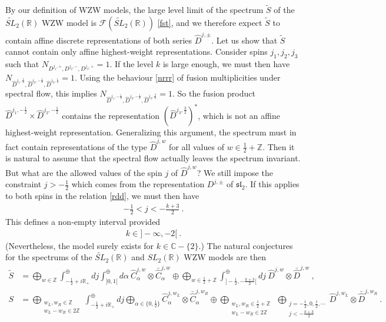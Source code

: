 \documentclass[12pt, a4paper, notitlepage, twoside]{report}
\numberwithin{equation}{section}
\theoremstyle{break}
\begin{document}
By our definition of WZW models, the large level limit of the spectrum $\tilde{S}$ of the $\widetilde{SL}_2(\mathbb{R})$ WZW model is $\mathcal{F}(\widetilde{SL}_2(\mathbb{R}))$ \eqref{fst}, and we therefore expect $\tilde{S}$ to contain affine discrete representations of both series $\hat{D}^{j,\pm}$.
Let us show that $\tilde{S}$ cannot contain only affine highest-weight representations.
Consider spins $j_1,j_2,j_3$ such that $N_{D^{j_1,+},D^{j_2,-},D^{j_3,+}}=1$.
If the level $k$ is large enough, we must then have $N_{\hat{D}^{j_1,\frac12},\hat{D}^{j_2,-\frac12},\hat{D}^{j_3,\frac12}}=1$.
Using the behaviour \eqref{nrrr} of fusion multiplicities under spectral flow, this implies $N_{\hat{D}^{j_1,-\frac12},\hat{D}^{j_2,-\frac12},\hat{D}^{j_3,\frac32}}=1$.
So the fusion product $\hat{D}^{j_1,-\frac12}\times \hat{D}^{j_2,-\frac12}$ contains the representation $(\hat{D}^{j_3,\frac32})^*$, which is not an affine highest-weight representation.
Generalizing this argument, the spectrum must in fact contain 
representations of the type $\hat{D}^{j,w}$ for all values of $w\in \frac12+{\mathbb{Z}}$.
Then it is natural to assume that the spectral flow actually leaves the spectrum invariant.
But what are the allowed values of the spin $j$ of $\hat{D}^{j,w}$? We still impose the constraint $j>-\frac12$ which comes from the representation $D^{j,\pm}$ of $\mathfrak{sl}_2$.
If this applies to both spins in the relation \eqref{rdd}, we must then have 
\begin{align}
 -\frac12 <j < -\frac{k+3}{2}\ .
\label{jimm}
\end{align}
This defines a non-empty interval provided
\begin{align}
 \boxed{k\in]-\infty,-2[}\ .
\end{align}
(Nevertheless, the model surely exists for $k\in \mathbb{C}-\{2\}$.)
The natural conjectures for the spectrums of the $\widetilde{SL}_2(\mathbb{R})$ and $SL_2(\mathbb{R})$ WZW models are then
\begin{align}
 \tilde{S} &= \bigoplus_{w\in{\mathbb{Z}}}\int^\oplus_{-\frac12+i{\mathbb{R}}_+} dj \int^\oplus_{]0,1[} d\alpha\ \hat{C}^{j,w}_\alpha \otimes \bar{\hat{C}}^{j,w}_{\alpha} 
\oplus \bigoplus_{w\in\frac12+{\mathbb{Z}}}\int^\oplus_{]-\frac12,-\frac{k+3}{2}[} dj\ \hat{D}^{j,w}\otimes \bar{\hat{D}}^{j,w} \ ,
\\
 S &= \bigoplus_{\substack{w_L,w_R\in{\mathbb{Z}}\\ w_L-w_R\in 2{\mathbb{Z}}}}\int^\oplus_{-\frac12+i{\mathbb{R}}_+} dj \bigoplus_{\alpha\in\{0,\frac12\}} \hat{C}^{j,w_L}_\alpha \otimes \bar{\hat{C}}^{j,w_R}_{\alpha} \oplus  \bigoplus_{\substack{w_L,w_R\in\frac12+{\mathbb{Z}}\\ w_L-w_R\in 2{\mathbb{Z}}}}\ \bigoplus_{\substack{j= -\frac12, 0,\frac12,\cdots \\ j<-\frac{k+3}{2}}} \hat{D}^{j,w_L}\otimes \bar{\hat{D}}^{j,w_R} \ .
\end{align}
\end{document}
